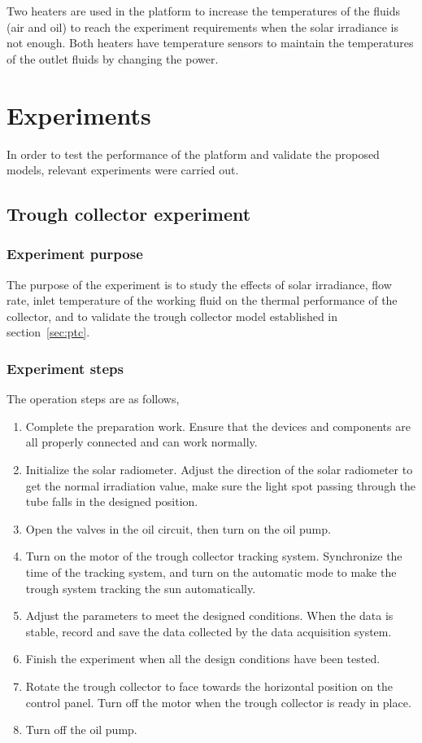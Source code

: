 Two heaters are used in the platform to increase the temperatures of the fluids (air and oil) to reach the experiment requirements when the solar irradiance is not enough. Both heaters have temperature sensors to maintain the temperatures of the outlet fluids by changing the power.
 


\section{Experiments}

In order to test the performance of the platform and validate the proposed models, relevant experiments were carried out.
\subsection{Trough collector experiment}
\subsubsection{Experiment purpose}
The purpose of the experiment is to study the effects of solar irradiance, flow rate, inlet temperature of the working fluid on the thermal performance of the collector, and to validate the trough collector model established in section~\ref{sec:ptc}. 
\subsubsection{Experiment steps}
The operation steps are as follows,
\begin{enumerate}[label=(\arabic*)]
	\item Complete the preparation work. Ensure that the devices and components are all properly connected and can work normally.
	\item Initialize the solar radiometer. Adjust the direction of the solar radiometer to get the normal irradiation value, make sure the light spot passing through the tube falls in the designed position.
	\item Open the valves in the oil circuit, then turn on the oil pump.
	\item Turn on the motor of the trough collector tracking system. Synchronize the time of the tracking system, and turn on the automatic mode to make the trough system tracking the sun automatically.
	\item Adjust the parameters to meet the designed conditions. When the data is stable, record and save the data collected by the data acquisition system.
	\item Finish the experiment when all the design conditions have been tested.
	\item Rotate the trough collector to face towards the horizontal position on the control panel. Turn off the motor when the trough collector is ready in place.
	\item Turn off the oil pump.
\end{enumerate}

